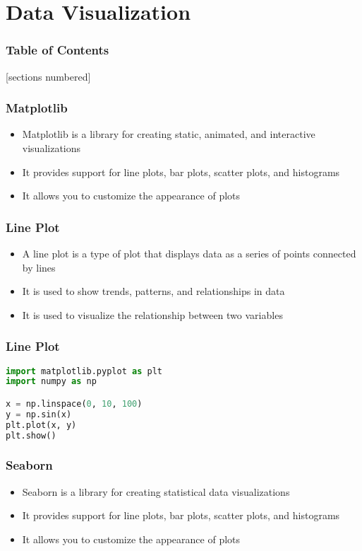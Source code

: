 \documentclass[serif, 9pt, aspectratio=32]{beamer}
\begin{document}
\section{Data Visualization}

\begin{frame}
    \frametitle{Table of Contents}
    [sections numbered]
    \tableofcontents[currentsection]
\end{frame}

\begin{frame}
    \centering
    \frametitle{Matplotlib}
    \begin{itemize}
        \setlength{\itemsep}{2em}
        \item Matplotlib is a library for creating static, animated, and interactive visualizations
        \item It provides support for line plots, bar plots, scatter plots, and histograms
        \item It allows you to customize the appearance of plots
    \end{itemize}
\end{frame}

\begin{frame}
    \centering
    \frametitle{Line Plot}
    \begin{itemize}
        \setlength{\itemsep}{2em}
        \item A line plot is a type of plot that displays data as a series of points connected by lines
        \item It is used to show trends, patterns, and relationships in data
        \item It is used to visualize the relationship between two variables
    \end{itemize}
\end{frame}

\begin{frame}[fragile]
    \frametitle{Line Plot}
    \begin{lstlisting}[language=Python]
import matplotlib.pyplot as plt
import numpy as np

x = np.linspace(0, 10, 100)
y = np.sin(x)
plt.plot(x, y)
plt.show()
    \end{lstlisting}
\end{frame}

\begin{frame}
    \centering
    \frametitle{Seaborn}
    \begin{itemize}
        \setlength{\itemsep}{2em}
        \item Seaborn is a library for creating statistical data visualizations
        \item It provides support for line plots, bar plots, scatter plots, and histograms
        \item It allows you to customize the appearance of plots
    \end{itemize}
\end{frame}
\end{document}
